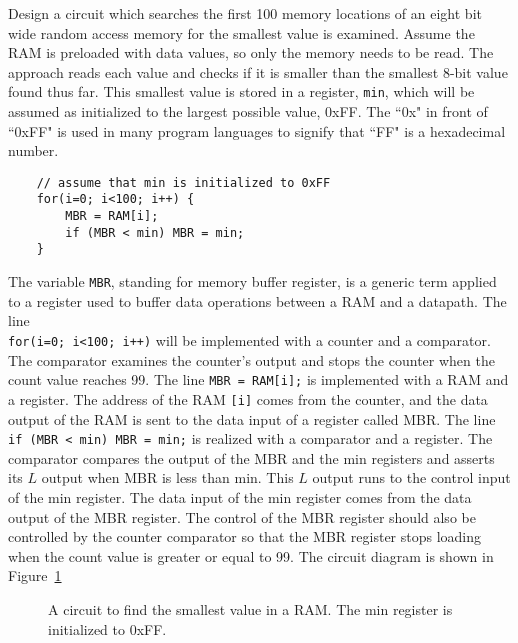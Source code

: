 Design a circuit which searches the first 
100 memory locations of an eight bit wide random access memory for the smallest 
value is examined.  Assume the RAM is preloaded with data values, so 
only the memory needs to be read.  The approach reads each value 
and checks if it is smaller than the smallest 8-bit value found
thus far.  This smallest value is stored in a register, \verb+min+, which
will be assumed as initialized to the largest possible value, 0xFF.  The ``0x"
in front of ``0xFF" is used in many program languages to signify that 
``FF" is a hexadecimal number.
\label{page:minsearch} 

\begin{verbatim}
    // assume that min is initialized to 0xFF
    for(i=0; i<100; i++) {
        MBR = RAM[i];
        if (MBR < min) MBR = min;
    }
\end{verbatim}

The variable \verb+MBR+, standing for memory buffer register, is a generic
term applied to a register used to buffer data operations between a RAM and 
a datapath.  The line \\
\verb^for(i=0; i<100; i++)^ will be implemented with a 
counter and a comparator.  The comparator examines the counter's output and  
stops the counter when the count value reaches 99.  The line 
\verb+MBR = RAM[i];+ is implemented with a RAM and a register.  The address
of the RAM \verb+[i]+ comes from the counter, and the data output of the RAM
is sent to the data input of a register called MBR.  The line 
\verb+if (MBR < min) MBR = min;+ is realized with a comparator and 
a register.  The comparator compares the output of the MBR and the min
registers and asserts its $L$ output when MBR is less than min.  This 
$L$ output runs to the control input of the min register.  The data 
input of the min register comes from the data output of the MBR 
register.  The control of the MBR register should also be controlled 
by the counter comparator so that the MBR register stops loading when 
the count value is greater or equal to 99.  The circuit diagram is 
shown in Figure~\ref{fig:sequentialBBmin} 

\begin{figure}[ht]
\caption{A circuit to find the smallest value in a RAM.  The min 
register is initialized to 0xFF.}
\label{fig:sequentialBBmin}
\end{figure}

